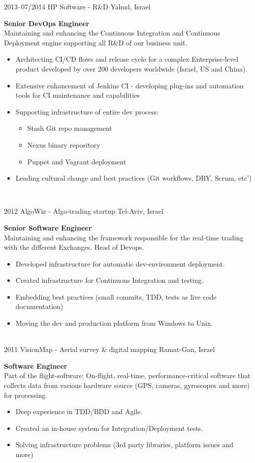 \documentclass[]{friggeri-cv} %
\begin{document}
\begin{entrylist}
\entry
{2013--07/2014}
{HP Software - R\&D}
{Yahud, Israel}
{\textbf{Senior DevOps Engineer} \\
Maintaining and enhancing the Continuous Integration and Continuous Deployment engine supporting all R\&D of our business unit.
\begin{itemize}
\item Architecting CI/CD flows and release cycle for a complex Enterprise-level product developed by over 200 developers worldwide (Israel, US and China).
\item Extensive enhancement of Jenkins CI - developing plug-ins and automation tools for CI maintenance and capabilities
\item Supporting infrastructure of entire dev process:
\begin{itemize}
\item Stash Git repo management
\item Nexus binary repository
\item Puppet and Vagrant deployment
\end{itemize}
\item Leading cultural change and best practices (Git workflows, DRY, Scrum, etc')
\end{itemize}}
\\
\end{entrylist}
\begin{entrylist}
\entry
{2012}
{AlgoWiz - Algo-trading startup}
{Tel-Aviv, Israel}
{\textbf{Senior Software Engineer} \\
Maintaining and enhancing the framework responsible for the real-time trading with the different Exchanges. Head of  Devops.
\begin{itemize}
\item Developed infrastructure for automatic dev-environment deployment.
\item Created infrastructure for Continuous Integration and testing.
\item Embedding best practices (small commits, TDD, tests as live code documentation)
\item Moving the dev and production platform from Windows to Unix.
\end{itemize}}
\\
\entry
{2011}
{VisionMap - Aerial survey \& digital mapping}
{Ramat-Gan, Israel}
{\textbf{Software Engineer} \\
Part of the flight-software: On-flight, real-time, performance-critical software that collects data from various hardware source (GPS, cameras, gyroscopes and more) for processing.
\begin{itemize}
\item Deep experience in TDD/BDD and Agile.
\item Created an in-house system for Integration/Deployment tests.
\item Solving infrastructure problems (3rd party libraries, platform issues and more)
\end{itemize}}
\end{entrylist}
\end{document}
